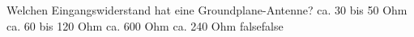     {Welchen Eingangswiderstand hat eine Groundplane-Antenne?}
    {ca. 30 bis 50 Ohm}
    {ca. 60 bis 120 Ohm}
    {ca. 600 Ohm}
    {ca. 240 Ohm}
    {false}{false}